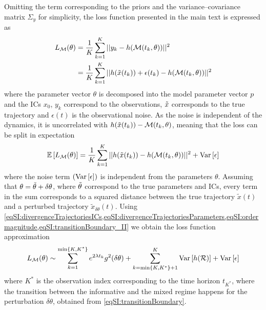 Omitting the term corresponding to the priors and the variance--covariance matrix $\Sigma_y$ for simplicity, the loss function presented in the main text is expressed as 
\begin{equation}
\begin{split}
	L_{\mathcal{M}}(\theta) &= \frac{1}{K} \sum_{k=1}^{K} ||y_{k} - h(\mathcal{M}(t_k,\theta))||^2\\
	                &= \frac{1}{K} \sum_{k=1}^{K} ||h(\Tilde x(t_k)) + \epsilon(t_k) - h(\mathcal{M}(t_k,\theta))||^2
\end{split}
\end{equation}
where the parameter vector $\theta$ is decomposed into the model parameter vector $p$ and the ICs $x_0$, $y_k$ correspond to the observations, $\Tilde x$ corresponds to the true trajectory and $\epsilon(t)$ is the observational noise. As the noise is independent of the dynamics, it is uncorrelated with $h(\Tilde x(t_k)) - \mathcal{M}(t_k,\theta)$, meaning that the loss can be split in expectation
\begin{equation}\label{eqSI:split_loss}
		{\ensuremath{\mathbb{E}}}\left[ L_{\mathcal{M}}(\theta) \right] = \frac{1}{K} \sum_{k=1}^{K} ||h(\Tilde x(t_k)) - h(\mathcal{M}(t_k,\theta))||^2 + {\operatorname{Var}}\left[\epsilon\right]
\end{equation}
%
where the noise term $\left({\operatorname{Var}}\left[\epsilon\right]\right)$ is independent from the parameters $\theta$.
Assuming that $\theta = \Tilde \theta + \delta\theta$, where $\Tilde \theta$ correspond to the true parameters and ICs, every term in the sum corresponds to a squared distance between the true trajectory $\tilde x(t)$ and a perturbed trajectory $\tilde x_{\delta \theta}(t)$. Using \cref{eqSI:divergenceTrajectoriesICs,eqSI:divergenceTrajectoriesParameters,eqSI:ordermagnitude,eqSI:transitionBoundary_II} we obtain the loss function approximation
\begin{equation}\label{eqSI:lossApprox}
	L_{\mathcal{M}}(\theta) \sim \sum_{k=1}^{\min \{ K, K^*\}} e^{2\lambda t_k} g^2(\delta \theta) +
	\sum_{k=\min \{ K, K^*\} + 1}^{K} {\operatorname{Var}} \left[h(\mathcal{R})\right] +  {\operatorname{Var}}\left[\epsilon\right]
\end{equation}
% 
where $K^*$ is the observation index corresponding to the time horizon $t_{K^*}$, where the transition between the informative and the mixed regime happens for the perturbation $\delta \theta$, obtained from \cref{eqSI:transitionBoundary}.

